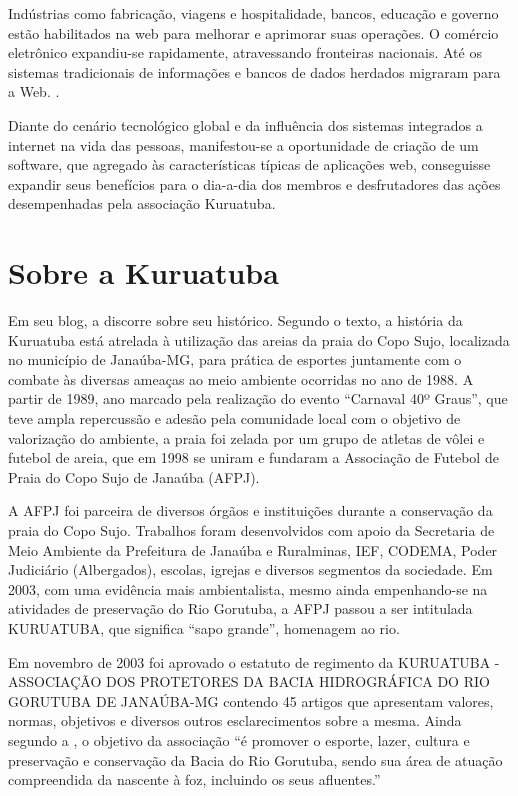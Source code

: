 \begin{citacao}
Indústrias como fabricação, viagens e hospitalidade, bancos, educação e governo estão habilitados na web para melhorar e aprimorar suas operações. O comércio eletrônico expandiu-se rapidamente, atravessando fronteiras nacionais. Até os sistemas tradicionais de informações e bancos de dados herdados migraram para a Web. \cite[p. 1]{ginige2001web}.
\end{citacao}

Diante do cenário tecnológico global e da influência dos sistemas integrados a internet na vida das pessoas, manifestou-se a oportunidade de criação de um software, que agregado às características típicas de aplicações web, conseguisse expandir seus benefícios para o dia-a-dia dos membros e desfrutadores das ações desempenhadas pela associação Kuruatuba.

\hspace{2.5cm}
\section{Sobre a Kuruatuba}
\hspace{2.5cm}

Em seu blog, a  discorre sobre seu histórico. Segundo o texto, a história da Kuruatuba está atrelada à utilização das areias da praia do Copo Sujo, localizada no município de Janaúba-MG, para prática de esportes juntamente com o combate às diversas ameaças ao meio ambiente ocorridas no ano de 1988. A partir de 1989, ano marcado pela realização do evento ``Carnaval 40º Graus'', que teve ampla repercussão e adesão pela comunidade local com o objetivo de valorização do ambiente, a praia foi zelada por um grupo de atletas de vôlei e futebol de areia, que em 1998 se uniram e fundaram a Associação de Futebol de Praia do Copo Sujo de Janaúba (AFPJ).

A AFPJ foi parceira de diversos órgãos e instituições durante a conservação da praia do Copo Sujo. Trabalhos foram desenvolvidos com apoio da Secretaria de Meio Ambiente da Prefeitura de Janaúba e Ruralminas, IEF, CODEMA, Poder Judiciário (Albergados), escolas, igrejas e diversos segmentos da sociedade. Em 2003, com uma evidência mais ambientalista, mesmo ainda empenhando-se na atividades de preservação do Rio Gorutuba, a AFPJ passou a ser intitulada KURUATUBA, que significa ``sapo grande'', homenagem ao rio.  

Em novembro de 2003 foi aprovado o estatuto de regimento da KURUATUBA - ASSOCIAÇÃO DOS PROTETORES DA BACIA HIDROGRÁFICA DO RIO GORUTUBA DE JANAÚBA-MG contendo 45 artigos que apresentam valores, normas, objetivos e diversos outros esclarecimentos sobre a mesma. Ainda segundo a \cite{Kuruatuba2011}, o objetivo da associação ``é promover o esporte, lazer, cultura e preservação e conservação da Bacia do Rio Gorutuba, sendo sua área de atuação compreendida da nascente à foz, incluindo os seus afluentes.''

